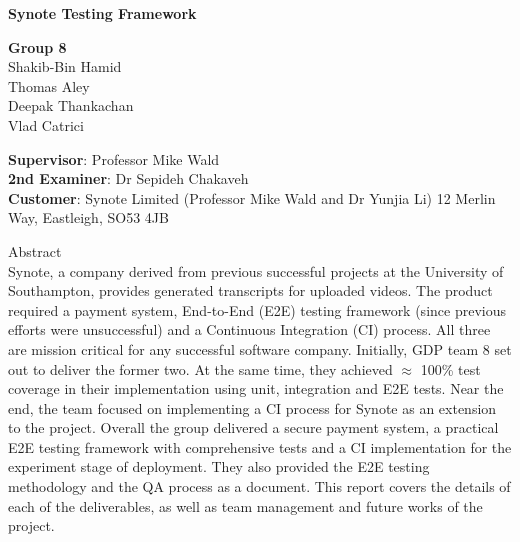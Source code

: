 \thispagestyle{plain}


\begin{center}
    
    {\selectfont

    \textbf{Synote Testing Framework}\\
        
    \vspace{1cm}
    
    \textbf{Group 8} \\
	Shakib-Bin Hamid \\ Thomas Aley \\ Deepak Thankachan \\ Vlad Catrici    
    
    \vspace{2cm}
	}    
\end{center}


{\selectfont
\textbf{Supervisor}: Professor Mike Wald\\
\textbf{2nd Examiner}: Dr Sepideh Chakaveh\\
\textbf{Customer}: Synote Limited (Professor Mike Wald and Dr Yunjia Li) 12 Merlin Way, Eastleigh, SO53 4JB
}

\vspace{1cm}

\begin{framed}

{\selectfont
Abstract\\

Synote, a company derived from previous successful projects at the University of Southampton, provides generated transcripts for uploaded videos. The product required a payment system, End-to-End (E2E) testing framework (since previous efforts were unsuccessful) and a Continuous Integration (CI) process. All three are mission critical for any successful software company. Initially, GDP team 8 set out to deliver the former two. At the same time, they achieved $\approx$ 100\% test coverage in their implementation using unit, integration and E2E tests. Near the end, the team focused on implementing a CI process for Synote as an extension to the project. Overall the group delivered a secure payment system, a practical E2E testing framework with comprehensive tests and a CI implementation for the experiment stage of deployment. They also provided the E2E testing methodology and the QA process as a document. This report covers the details of each of the deliverables, as well as team management and future works of the project.
}
\end{framed}

\restoregeometry

\large


